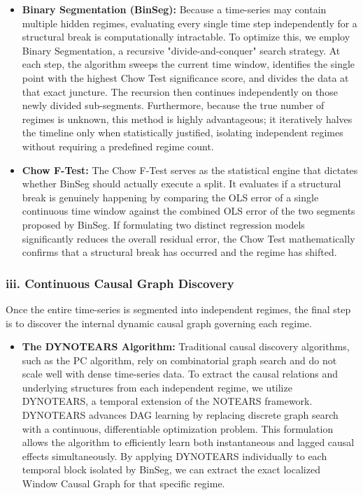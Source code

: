 \begin{itemize}
    \item \textbf{Binary Segmentation (BinSeg):} Because a time-series may contain multiple hidden regimes, evaluating every single time step independently for a structural break is computationally intractable. To optimize this, we employ Binary Segmentation, a recursive "divide-and-conquer" search strategy. At each step, the algorithm sweeps the current time window, identifies the single point with the highest Chow Test significance score, and divides the data at that exact juncture. The recursion then continues independently on those newly divided sub-segments. Furthermore, because the true number of regimes is unknown, this method is highly advantageous; it iteratively halves the timeline only when statistically justified, isolating independent regimes without requiring a predefined regime count.  
    \item \textbf{Chow F-Test:} The Chow F-Test serves as the statistical engine that dictates whether BinSeg should actually execute a split. It evaluates if a structural break is genuinely happening by comparing the OLS error of a single continuous time window against the combined OLS error of the two segments proposed by BinSeg. If formulating two distinct regression models significantly reduces the overall residual error, the Chow Test mathematically confirms that a structural break has occurred and the regime has shifted.
\end{itemize}

\subsubsection*{iii. Continuous Causal Graph Discovery}
Once the entire time-series is segmented into independent regimes, the final step is to discover the internal dynamic causal graph governing each regime. 

\begin{itemize}
    \item \textbf{The DYNOTEARS Algorithm:} Traditional causal discovery algorithms, such as the PC algorithm, rely on combinatorial graph search and do not scale well with dense time-series data. To extract the causal relations and underlying structures from each independent regime, we utilize DYNOTEARS, a temporal extension of the NOTEARS framework. DYNOTEARS advances DAG learning by replacing discrete graph search with a continuous, differentiable optimization problem. This formulation allows the algorithm to efficiently learn both instantaneous and lagged causal effects simultaneously. By applying DYNOTEARS individually to each temporal block isolated by BinSeg, we can extract the exact localized Window Causal Graph for that specific regime.
\end{itemize}

